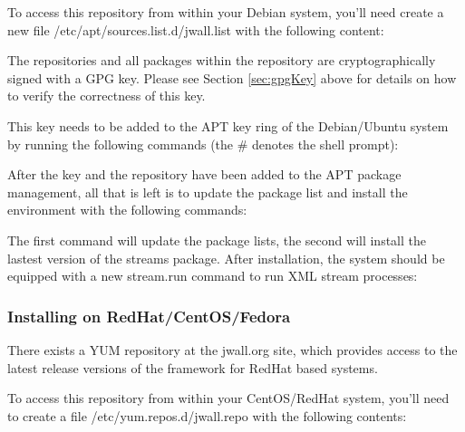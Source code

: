 To access this repository from within your Debian system, you'll need
create a new file {\ttfamily /etc/apt/sources.list.d/jwall.list} with
the following content:


The repositories and all packages within the repository are
cryptographically signed with a GPG key. Please see Section
\ref{sec:gpgKey} above for details on how to verify the correctness of
this key.

This key needs to be added to the APT key ring of the Debian/Ubuntu
system by running the following commands (the {\ttfamily \#} denotes
the shell prompt):


After the key and the repository have been added to the APT package
management, all that is left is to update the package list and install
the \streams environment with the following commands:


The first command will update the package lists, the second will install
the lastest version of the {\ttfamily streams} package. After installation,
the system should be equipped with a new {\ttfamily stream.run} command
to run XML stream processes:


\subsubsection{\label{sec:installRPM}Installing on RedHat/CentOS/Fedora}
There exists a YUM repository at the {\ttfamily jwall.org} site, which
provides access to the latest release versions of the \streams framework
for RedHat based systems.

To access this repository from within your CentOS/RedHat system,
you'll need to create a file {\ttfamily /etc/yum.repos.d/jwall.repo}
with the following contents:


